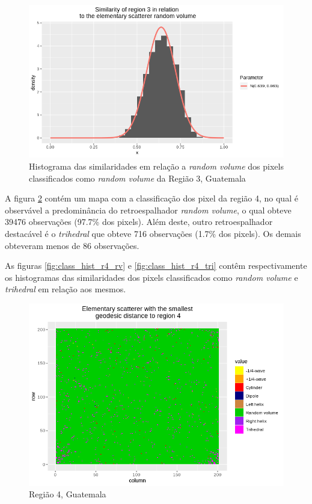 \documentclass[12pt]{article}
\begin{document}
\begin{figure}[!h]
    \centering   
    \includegraphics[width = 0.9\linewidth]{../../Images/Report_18_12_20/Classifier_Geo_Dist/Histograms/Guate/region3_rv_sm_filter.png}
    \caption{Histograma das similaridades em relação a \textit{random volume} dos pixels classificados como \textit{random volume} da Região 3, Guatemala}
    \label{fig:class_hist_r3_rv}
\end{figure}

A figura \ref{fig:class_map_r4} contém um mapa com a classificação dos pixel da região 4, no qual é observável a predominância do retroespalhador \textit{random volume}, o qual obteve 39476 observações (97.7\% dos pixels). Além deste, outro retroespalhador destacável é o \textit{trihedral} que obteve 716 observações (1.7\% dos pixels). Os demais obteveram menos de 86 observações. 

As figuras \ref{fig:class_hist_r4_rv} e \ref{fig:class_hist_r4_tri} contêm respectivamente os histogramas das similaridades dos pixels classificados como \textit{random volume} e \textit{trihedral} em relação aos mesmos.

\begin{figure}[!h]
    \centering    
    \includegraphics[width = 0.9\linewidth]{../../Images/Report_18_12_20/Classifier_Geo_Dist/Class_Map/Guate/region4_predomain.png}
    \caption{Região 4, Guatemala}
    \label{fig:class_map_r4}
\end{figure}
\end{document}
